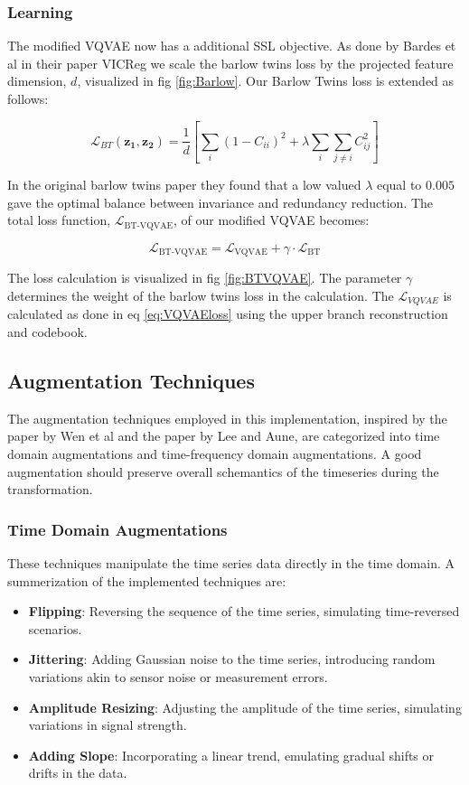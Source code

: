 \subsubsection{Learning}
The modified VQVAE now has a additional SSL objective. As done by Bardes et al in their paper VICReg\cite{VICReg} we scale the barlow twins loss by the projected feature dimension, $d$, visualized in fig \ref{fig:Barlow}. Our Barlow Twins loss is extended as follows:

\begin{equation}
\mathcal{L}_{BT}(\mathbf{z_1}, \mathbf{z_2}) =\frac{1}{d} \left[ \sum_i (1 - C_{ii})^2 + \lambda \sum_i \sum_{j \neq i} C_{ij}^2\right]
\end{equation}

In the original barlow twins paper\cite{Barlow} they found that a low valued $\lambda$ equal to $0.005$ gave the optimal balance between invariance and redundancy reduction. 
The total loss function, $\mathcal{L}_{\text{BT-VQVAE}}$, of our modified VQVAE becomes:

\begin{equation}
    \mathcal{L}_{\text{BT-VQVAE}} = \mathcal{L}_{\text{VQVAE}} + \gamma \cdot \mathcal{L}_\text{BT}
    \label{eq:BTVQVAEloss}
\end{equation}

The loss calculation is visualized in fig \ref{fig:BTVQVAE}. The parameter $\gamma$ determines the weight of the barlow twins loss in the calculation. The $\mathcal{L}_{VQVAE}$ is calculated as done in eq \ref{eq:VQVAEloss} using the upper branch reconstruction and codebook.

\subsection{Augmentation Techniques}
The augmentation techniques employed in this implementation, inspired by the paper by Wen et al\cite{augs} and the paper by Lee and Aune\cite{SSLs}, are categorized into time domain augmentations and time-frequency domain augmentations. 
A good augmentation should preserve overall schemantics of the timeseries during the transformation. 

\subsubsection*{Time Domain Augmentations}
These techniques manipulate the time series data directly in the time domain. A summerization of the implemented techniques are:
\begin{itemize}
    \item \textbf{Flipping}: Reversing the sequence of the time series, simulating time-reversed scenarios.
    \item \textbf{Jittering}: Adding Gaussian noise to the time series, introducing random variations akin to sensor noise or measurement errors.
    \item \textbf{Amplitude Resizing}: Adjusting the amplitude of the time series, simulating variations in signal strength.
    \item \textbf{Adding Slope}: Incorporating a linear trend, emulating gradual shifts or drifts in the data.
\end{itemize}


